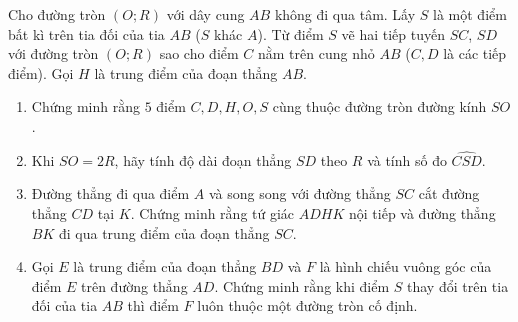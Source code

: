\begin{bt}%
	Cho đường tròn $(O;R)$ với dây cung $AB$ không đi qua tâm. Lấy $S$ là một điểm bất kì trên tia đối của tia $AB$ ($S$ khác $A$). Từ điểm $S$ vẽ hai tiếp tuyến $SC$, $SD$ với đường tròn $(O;R)$ sao cho điểm $C$ nằm trên cung nhỏ $AB$ ($C, D$ là các tiếp điểm). Gọi $H$ là trung điểm của đoạn thẳng $AB$. 
	\begin{enumerate}
		\item Chứng minh rằng $5$ điểm $C,D,H,O,S$ cùng thuộc đường tròn đường kính $SO$. 
		\item Khi $SO=2R$, hãy tính độ dài đoạn thẳng $SD$ theo $R$ và tính số đo $\widehat{CSD}$.
		\item Đường thẳng đi qua điểm $A$ và song song với đường thẳng $SC$ cắt đường thẳng $CD$ tại $K$. Chứng minh rằng tứ giác $ADHK$ nội tiếp và đường thẳng $BK$ đi qua trung điểm của đoạn thẳng $SC$. 
		\item Gọi $E$ là trung điểm của đoạn thẳng $BD$ và $F$ là hình chiếu vuông góc của điểm $E$ trên đường thẳng $AD$. Chứng minh rằng khi điểm $S$ thay đổi trên tia đối của tia $AB$ thì điểm $F$ luôn thuộc một đường tròn cố định.
	\end{enumerate}
\end{bt}
